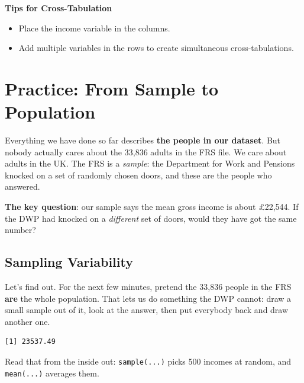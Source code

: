 \documentclass[
  letterpaper,
  DIV=11,
  numbers=noendperiod]{scrreprt}
\newenvironment{Shaded}{\begin{snugshade}}{\end{snugshade}}
\newcommand{\AttributeTok}[1]{\textcolor[rgb]{0.40,0.45,0.13}{#1}}
\newcommand{\DecValTok}[1]{\textcolor[rgb]{0.68,0.00,0.00}{#1}}
\newcommand{\FunctionTok}[1]{\textcolor[rgb]{0.28,0.35,0.67}{#1}}
\newcommand{\NormalTok}[1]{\textcolor[rgb]{0.00,0.23,0.31}{#1}}
\newcommand{\SpecialCharTok}[1]{\textcolor[rgb]{0.37,0.37,0.37}{#1}}
\providecommand{\tightlist}{%
  \setlength{\itemsep}{0pt}\setlength{\parskip}{0pt}}
\begin{document}
\textbf{Tips for Cross-Tabulation}

\begin{itemize}
\tightlist
\item
  Place the income variable in the columns.
\item
  Add multiple variables in the rows to create simultaneous
  cross-tabulations.
\end{itemize}

\section{Practice: From Sample to
Population}\label{practice-from-sample-to-population}

Everything we have done so far describes \textbf{the people in our
dataset}. But nobody actually cares about the 33,836 adults in the FRS
file. We care about adults in the UK. The FRS is a \emph{sample}: the
Department for Work and Pensions knocked on a set of randomly chosen
doors, and these are the people who answered.

\textbf{The key question}: our sample says the mean gross income is
about £22,544. If the DWP had knocked on a \emph{different} set of
doors, would they have got the same number?

\subsection{Sampling Variability}\label{sampling-variability}

Let's find out. For the next few minutes, pretend the 33,836 people in
the FRS \textbf{are} the whole population. That lets us do something the
DWP cannot: draw a small sample out of it, look at the answer, then put
everybody back and draw another one.

\begin{Shaded}
\end{Shaded}

\begin{verbatim}
[1] 23537.49
\end{verbatim}

Read that from the inside out: \texttt{sample(...)} picks 500 incomes at
random, and \texttt{mean(...)} averages them.
\end{document}
